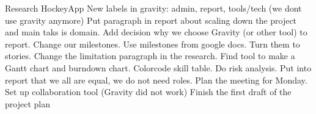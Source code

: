 \nextItem Research HockeyApp
\nextItem New labels in gravity: admin, report, tools/tech (we dont use gravity anymore)
\nextItem Put paragraph in report about scaling down the project and main taks is domain.
\nextItem Add decision why we choose Gravity (or other tool) to report.
\nextItem  Change our milestones. Use milestones from google docs. Turn them to stories.
\nextItem Change the limitation paragraph in the research.
\nextItem Find tool to make a Gantt chart and burndown chart.
\nextItem Colorcode skill table. Do risk analysis.
\nextItem Put into report that we all are equal, we do not need roles.
\nextItem Plan the meeting for Monday.
\nextItem Set up collaboration tool (Gravity did not work)
\nextItem Finish the first draft of the project plan
